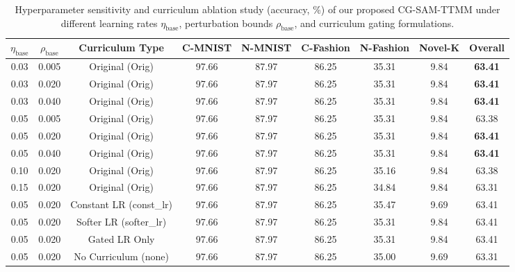 \documentclass{article}
\theoremstyle{plain}
\theoremstyle{definition}
\theoremstyle{remark}
\begin{document}
\begin{table}[t]
\caption{Hyperparameter sensitivity and curriculum ablation study (accuracy, \%) of our proposed CG-SAM-TTMM under different learning rates $\eta_{\text{base}}$, perturbation bounds $\rho_{\text{base}}$, and curriculum gating formulations.}
\label{tab:ablation}
\vskip 0.15in
\begin{center}
\begin{small}
\begin{sc}
\begin{tabular}{ccccccccc}
\toprule
$\eta_{\text{base}}$ & $\rho_{\text{base}}$ & Curriculum Type & C-MNIST & N-MNIST & C-Fashion & N-Fashion & Novel-K & Overall \\
\midrule
0.03 & 0.005 & Original (Orig) & 97.66 & 87.97 & 86.25 & 35.31 & 9.84 & \textbf{63.41} \\
0.03 & 0.020 & Original (Orig) & 97.66 & 87.97 & 86.25 & 35.31 & 9.84 & \textbf{63.41} \\
0.03 & 0.040 & Original (Orig) & 97.66 & 87.97 & 86.25 & 35.31 & 9.84 & \textbf{63.41} \\
\midrule
0.05 & 0.005 & Original (Orig) & 97.66 & 87.97 & 86.25 & 35.31 & 9.84 & 63.38 \\
0.05 & 0.020 & Original (Orig) & 97.66 & 87.97 & 86.25 & 35.31 & 9.84 & \textbf{63.41} \\
0.05 & 0.040 & Original (Orig) & 97.66 & 87.97 & 86.25 & 35.31 & 9.84 & \textbf{63.41} \\
\midrule
0.10 & 0.020 & Original (Orig) & 97.66 & 87.97 & 86.25 & 35.16 & 9.84 & 63.38 \\
0.15 & 0.020 & Original (Orig) & 97.66 & 87.97 & 86.25 & 34.84 & 9.84 & 63.31 \\
\midrule
0.05 & 0.020 & Constant LR (const\_lr) & 97.66 & 87.97 & 86.25 & 35.47 & 9.69 & 63.41 \\
0.05 & 0.020 & Softer LR (softer\_lr) & 97.66 & 87.97 & 86.25 & 35.31 & 9.84 & 63.41 \\
0.05 & 0.020 & Gated LR Only & 97.66 & 87.97 & 86.25 & 35.31 & 9.84 & 63.41 \\
0.05 & 0.020 & No Curriculum (none) & 97.66 & 87.97 & 86.25 & 35.00 & 9.69 & 63.31 \\
\bottomrule
\end{tabular}
\end{sc}
\end{small}
\end{center}
\vskip -0.1in
\end{table}
\end{document}
